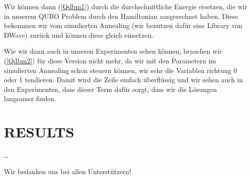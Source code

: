 Wir können dann (\ref{Qdbm1}) durch die durchschnittliche Energie ersetzen, die wir in unserem QUBO Problem durch den Hamiltonian ausgerechnet haben. Diese bekommen wir vom simulierten Annealing (wir benutzen dafür eine Library von DWave) zurück und können diese gleich einsetzen.

Wie wir dann auch in unseren Experimenten sehen können, brauchen wir (\ref{Qdbm2}) für diese Version nicht mehr, da wir mit den Parametern im simulierten Annealing schon steuern können, wir sehr die Variablen richtung 0 oder 1 tendieren. Damit wird die Zeile einfach überflüssig und wir sehen auch in den Experimenten, dass dieser Term dafür sorgt, dass wir die Lösungen langsamer finden.

\section{RESULTS}
\label{sec:res}

\ldots


\begin{acknowledgement}
Wir bedanken uns bei allen Unterstützern!
\end{acknowledgement}
